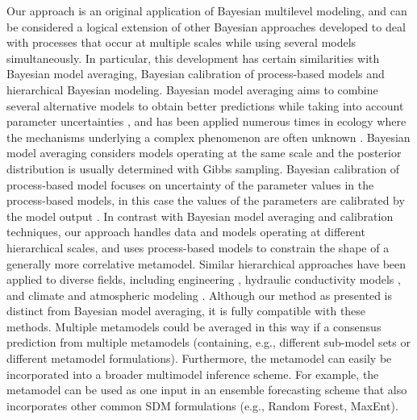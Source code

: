 \documentclass[11pt]{article}
\begin{document}
Our approach is an original application of Bayesian multilevel modeling, and can be considered a logical extension of other Bayesian approaches developed to deal with processes that occur at multiple scales while using several models simultaneously. 
In particular, this development has certain similarities with Bayesian model averaging, Bayesian calibration of process-based models and hierarchical Bayesian modeling. 
Bayesian model averaging aims to combine several alternative models to obtain better predictions while taking into account parameter uncertainties \citep{Hoeting1999}, and has been applied numerous times in ecology where the mechanisms underlying a complex phenomenon are often unknown \citep[e.g.,][]{Wintle2003, Link2006}. 
Bayesian model averaging considers models operating at the same scale and the posterior distribution is usually determined with Gibbs sampling. 
Bayesian calibration of process-based model focuses on uncertainty of the parameter values in the process-based models, in this case the values of the parameters are calibrated by the model output \citep{VanOijen2005, Hartig2012}. 
In contrast with Bayesian model averaging and calibration techniques, our approach handles data and models operating at different hierarchical scales, and uses process-based models to constrain the shape of a generally more correlative metamodel.
Similar hierarchical approaches have been applied to diverse fields, including engineering \citep{Booth2013}, hydraulic conductivity models \citep{Dostert2009, Efendiev2005}, and climate and atmospheric modeling \citep{Mcmillan2010, Kang2012}.
Although our method as presented is distinct from Bayesian model averaging, it is fully compatible with these methods.
Multiple metamodels could be averaged in this way if a consensus prediction from multiple metamodels (containing, e.g., different sub-model sets or different metamodel formulations).
Furthermore, the metamodel can easily be incorporated into a broader multimodel inference scheme.
For example, the metamodel can be used as one input in an ensemble forecasting scheme that also incorporates other common SDM formulations (e.g., Random Forest, MaxEnt).

\end{document}
